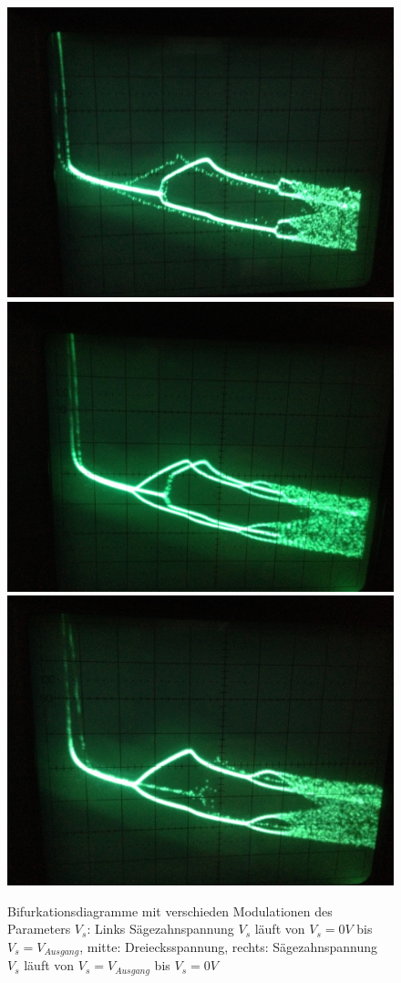 \documentclass[12pt,a4paper]{article}
\begin{document}
\begin{figure}[!htbp]
\centering
\includegraphics[scale=0.12]{bif-ldr/dreieck_1}
\includegraphics[scale=0.12]{bif-ldr/dreieck_2}
\includegraphics[scale=0.12]{bif-ldr/dreieck_3}
\caption{Bifurkationsdiagramme mit verschieden Modulationen des Parameters $V_s$: Links Sägezahnspannung $V_s$ läuft von $V_s=0V$ bis $V_s=V_{Ausgang}$, mitte: Dreiecksspannung, rechts: Sägezahnspannung $V_s$ läuft von $V_s=V_{Ausgang}$ bis $V_s=0V$}
\label{fig:ldr-modellierung}
\end{figure}
\end{document}
